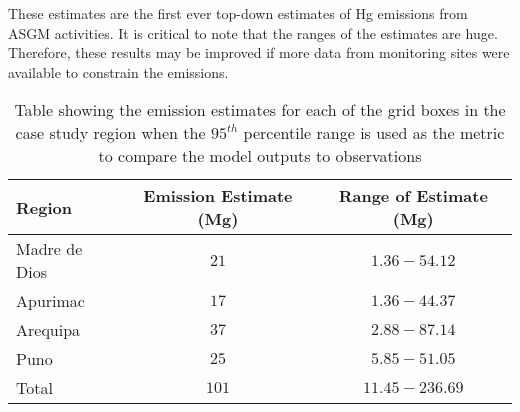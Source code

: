 
\begin{flushleft}
    These estimates are the first ever top-down estimates of Hg emissions from ASGM activities. It is critical to note that the ranges of the estimates are huge. Therefore, these results may be improved if more data from monitoring sites were available to constrain the emissions. 
\end{flushleft}    
\begin{table}[H]
\caption{Table showing the emission estimates for each of the grid boxes in the case study region when the $95^{th}$ percentile range is used as the metric to compare the model outputs to observations}
    \label{tab:MCMC_estimates}
\begin{tabular}{lcc}

\textbf{Region}        & \textbf{Emission Estimate (Mg)}  &     \textbf{Range of Estimate (Mg)}                      \\
\hline
Madre de Dios          & $21$                               & $1.36 - 54.12$\\

Apurimac               & $17$                               & $1.36 - 44.37$\\

Arequipa               & $37$                               & $2.88 - 87.14$\\

Puno                    & $25$                              & $5.85 - 51.05$\\
\hline
Total                  & $101$                            &  $11.45 - 236.69$ \\
\hline
\end{tabular}
\centering
\end{table}

